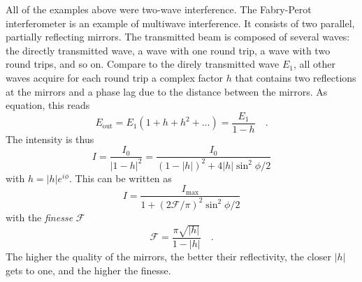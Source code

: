 All of the examples above were two-wave interference. The Fabry-Perot interferometer is an example of multiwave interference. It consists of two parallel, partially reflecting mirrors. The transmitted beam is composed of several waves: the directly transmitted wave, a wave with one round trip, a wave with two round trips, and so on. Compare to the direly transmitted wave $E_1$, all other waves acquire for each round trip a complex factor $h$ that contains two reflections at the mirrors and a phase lag due to the distance between the mirrors.
As equation, this reads
\begin{equation}
  E_\text{out} = E_1 \left( 1 + h + h^2 + \dots  \right) = \frac{ E_1 }{1 - h}  \quad .
\end{equation}
The intensity is thus
\begin{equation}
  I = \frac{I_0}{| 1 - h |^2} = \frac{I_0}{(1 - |h|)^2 + 4 |h| \sin^2 \phi/2}
\end{equation}
with $h = |h| e^{i \phi}$. This can be written as
\begin{equation}
  I = \frac{I_\text{max}}{1 + (2 \mathcal{F}/ \pi)^2  \sin^2 \phi/2}
\end{equation}
with the \emph{finesse} $\mathcal{F}$
\begin{equation}
  \mathcal{F} = \frac{\pi \sqrt{|h|}}{1 - |h|}  \quad .
\end{equation}
The higher the quality of the mirrors, the better their reflectivity, the closer $|h|$ gets to one, and the higher the finesse.

